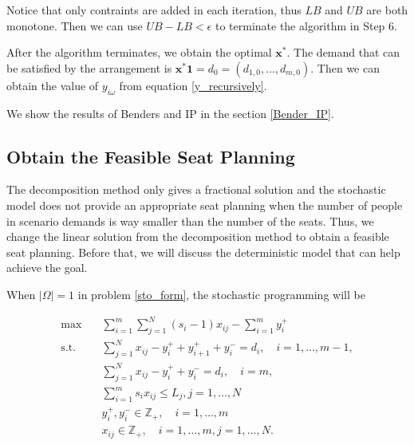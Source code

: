 \begin{remark}
  Notice that only contraints are added in each iteration, thus $LB$ and $UB$ are both monotone. Then we can use $UB - LB < \epsilon$ to terminate the algorithm in Step 6.
\end{remark}


After the algorithm terminates, we obtain the optimal $\mathbf{x}^{*}$. The demand that can be satisfied by the arrangement is $\mathbf{x}^{*} \mathbf{1} = d_0 = (d_{1,0},\ldots,d_{m,0})$.
Then we can obtain the value of $y_{i \omega}$ from equation \eqref{y_recursively}.

We show the results of Benders and IP in the section \ref{Bender_IP}.

\subsection{Obtain the Feasible Seat Planning}\label{seat_assignment}
The decomposition method only gives a fractional solution and the stochastic model does not provide an appropriate seat planning when the number of people in scenario demands is way smaller than the number of the seats. Thus, we change the linear solution from the decomposition method to obtain a feasible seat planning. Before that, we will discuss the deterministic model that can help achieve the goal. 


When $|\Omega| =1$ in problem \eqref{sto_form}, the stochastic programming will be 

\begin{equation}\label{one_form}
  \begin{aligned}
  \max \quad & \sum_{i=1}^{m}  \sum_{j= 1}^{N} (s_i-1) x_{ij} - \sum_{i=1}^{m} y_{i}^{+}  \\
  \text {s.t.} \quad & \sum_{j= 1}^{N} x_{ij} - y_{i}^{+}+ y_{i+1}^{+} + y_{i}^{-} = d_{i}, \quad i =1,\ldots,m-1, \\
  & \sum_{j= 1}^{N} x_{ij} -y_{i}^{+} + y_{i}^{-} = d_{i}, \quad i = m, \\
  & \sum_{i=1}^{m} s_{i} x_{ij} \leq L_j, j =1,\ldots, N\\
  & y_{i}^{+}, y_{i}^{-} \in \mathbb{Z}_{+}, \quad i = 1,\ldots,m \\
  & x_{ij} \in \mathbb{Z}_{+}, \quad i=1,\ldots,m, j = 1,\ldots,N.
  \end{aligned}
\end{equation}

